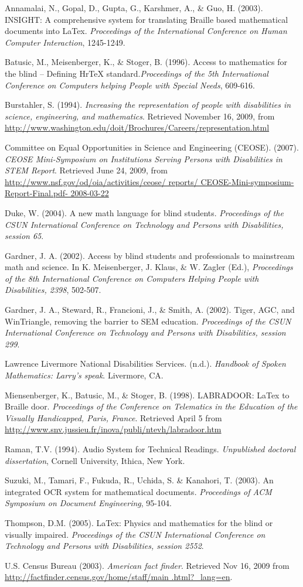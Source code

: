 \documentclass[11.5pt]{sig-alternate} %
\begin{document}
Annamalai, N., Gopal, D., Gupta, G., Karshmer, A., \& Guo, H. (2003). INSIGHT: A comprehensive system for translating Braille based mathematical documents into LaTex. \textit{Proceedings of the International Conference on Human Computer Interaction}, 1245-1249.

Batusic, M., Meisenberger, K., \& Stoger, B. (1996). Access to mathematics for the blind – Defining HrTeX standard.\textit{Proceedings of the 5th International Conference on Computers helping People with Special Needs}, 609-616.

Burstahler, S. (1994). \textit{Increasing the representation of people with disabilities in science, engineering, and mathematics}. Retrieved November 16, 2009, from \url{http://www.washington.edu/doit/Brochures/Careers/representation.html}

Committee on Equal Opportunities in Science and Engineering (CEOSE). (2007). \textit{CEOSE Mini-Symposium on Institutions Serving Persons with Disabilities in STEM Report}. Retrieved June 24, 2009, from \url{http://www.nsf.gov/od/oia/activities/ceose/ reports/ CEOSE-Mini-symposium-Report-Final.pdf- 2008-03-22}

Duke, W. (2004). A new math language for blind students. \textit{Proceedings of the CSUN International Conference on Technology and Persons with Disabilities, session 65}.

Gardner, J. A. (2002). Access by blind students and professionals to mainstream math and science. In K. Meisenberger, J. Klaus, \& W. Zagler (Ed.), \textit{Proceedings of the 8th International Conference on Computers Helping People with Disabilities, 2398}, 502-507.

Gardner, J. A., Steward, R., Francioni, J., \& Smith, A. (2002). Tiger, AGC, and WinTriangle, removing the barrier to SEM education. \textit{Proceedings of the CSUN International Conference on Technology and Persons with Disabilities, session 299}.

Lawrence Livermore National Disabilities Services. (n.d.). \textit{Handbook of Spoken Mathematics: Larry’s speak}. Livermore, CA.

Miensenberger, K., Batusic, M., \& Stoger, B. (1998). LABRA\-DOOR: LaTex to Braille door. \textit{Proceedings of the Conference on Telematics in the Education of the Visually Handicapped, Paris, France}. Retrieved April 5 from \url{http://www.snv.jussieu.fr/inova/publi/ntevh/labradoor.htm}

Raman, T.V. (1994). Audio System for Technical Readings. \textit{Unpublished doctoral dissertation}, Cornell University, Ithica, New York.

Suzuki, M., Tamari, F., Fukuda, R., Uchida, S. \& Kanahori, T. (2003). An integrated OCR system for mathematical documents. \textit{Proceedings of ACM Symposium on Document Engineering}, 95-104.

Thompson, D.M. (2005). LaTex: Physics and mathematics for the blind or visually impaired. \textit{Proceedings of the CSUN International Conference on Technology and Persons with Disabilities, session 2552}.

U.S. Census Bureau (2003). \textit{American fact finder}. Retrieved Nov 16, 2009 from \url{http://factfinder.census.gov/home/staff/main .html?_lang=en}.
\end{document}
